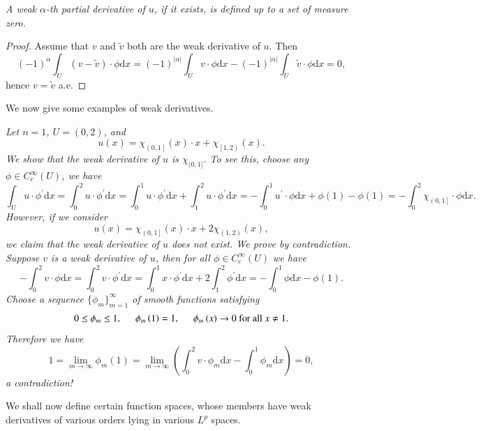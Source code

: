 \begin{lemma}\em
A weak $\alpha$-th partial derivative of $u$, if it exists, is defined up to a set of measure zero.
\end{lemma}
\begin{proof}
Assume that $v$ and $\widetilde{v}$ both are the weak derivative of $u$. Then 
$$
\left( -1 \right) ^{\alpha}\int_U{\left( v-\widetilde{v} \right) \cdot \phi \mathrm{d}x}=\left( -1 \right) ^{\left| \alpha \right|}\int_U{v\cdot \phi \mathrm{d}x}-\left( -1 \right) ^{\left| \alpha \right|}\int_U{\widetilde{v}\cdot \phi \mathrm{d}x}=0,
$$
hence $v=\widetilde{v}$ a.e.
\end{proof}
We now give some examples of weak derivatives.
\begin{example}\em
Let $n=1$, $U=(0,2)$, and 
$$
u\left( x \right) =\chi _{\left( 0,1 \right]}\left( x \right) \cdot x+\chi _{\left[ 1,2 \right)}\left( x \right) .
$$
We show that the weak derivative of $u$ is $\chi_{(0,1]}$. To see this, choose any $\phi\in C_c^\infty(U)$, we have 
$$
\int_U{u\cdot \phi ^{\prime}\mathrm{d}x}=\int_0^2{u\cdot \phi ^{\prime}\mathrm{d}x}=\int_0^1{u\cdot \phi ^{\prime}\mathrm{d}x}+\int_1^2{u\cdot \phi ^{\prime}\mathrm{d}x}=-\int_0^1{u^{\prime}\cdot \phi \mathrm{d}x}+\phi \left( 1 \right) -\phi \left( 1 \right) =-\int_0^2{\chi _{\left( 0,1 \right]}\cdot \phi \mathrm{d}x}.
$$
However, if we consider 
$$
u\left( x \right) =\chi _{\left( 0,1 \right]}\left( x \right) \cdot x+2\chi _{\left( 1,2 \right)}\left( x \right) ,
$$
we claim that the weak derivative of $u$ does not exist. We prove by contradiction. Suppose $v$ is a weak derivative of $u$, then for all $\phi\in C_c^\infty(U)$ we have 
$$
-\int_0^2{v\cdot \phi \mathrm{d}x}=\int_0^2{v\cdot \phi ^{\prime}\mathrm{d}x}=\int_0^1{x\cdot \phi ^{\prime}\mathrm{d}x}+2\int_1^2{\phi ^{\prime}\mathrm{d}x}=-\int_0^1{\phi \mathrm{d}x}-\phi \left( 1 \right) .
$$
Choose a sequence $\{\phi_m\}_{m=1}^\infty$ of smooth functions satisfying 
$$
0\le \phi _m\le 1,\hspace{0.5cm}\phi _m\left( 1 \right) =1,\hspace{0.5cm}\phi _m\left( x \right) \rightarrow 0\ \text{for all}\ x\ne 1.
$$
Therefore we have 
$$
1=\lim_{m\rightarrow \infty} \phi _m\left( 1 \right) =\lim_{m\rightarrow \infty} \left( \int_0^2{v\cdot \phi _m\mathrm{d}x}-\int_0^1{\phi _m\mathrm{d}x} \right) =0,
$$
a contradiction!
\end{example}
We shall now define certain function spaces, whose members have weak derivatives of various orders lying in various $L^p$ spaces.
